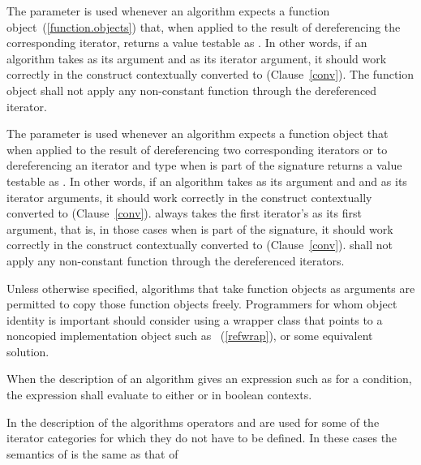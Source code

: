 \pnum
The
parameter is used whenever an algorithm expects a function object~(\ref{function.objects})
that, when applied to the result
of dereferencing the corresponding iterator, returns a value testable as
.
In other words, if an algorithm
takes
as its argument and 
as its iterator argument, it should work correctly in the
construct
 contextually converted to  (Clause~\ref{conv}).
The function object
shall not apply any non-constant
function through the dereferenced iterator.

\pnum
The
parameter is used whenever an algorithm expects a function object that when applied to
the result of dereferencing two corresponding iterators or to dereferencing an
iterator and type
when
is part of the signature returns a value testable as
.
In other words, if an algorithm takes
as its argument and  and  as
its iterator arguments, it should work correctly in
the construct
 contextually converted to  (Clause~\ref{conv}).
always takes the first
iterator's 
as its first argument, that is, in those cases when
is part of the signature, it should work
correctly in the
construct  contextually converted to  (Clause~\ref{conv}).
 shall not
apply any non-constant function through the dereferenced iterators.

\pnum
\begin{note}
Unless otherwise specified, algorithms that take function objects as arguments
are permitted to copy those function objects freely. Programmers for whom object
identity is important should consider using a wrapper class that points to a
noncopied implementation object such as ~(\ref{refwrap}), or some equivalent solution.
\end{note}

\pnum
When the description of an algorithm gives an expression such as
for a condition, the expression shall evaluate to
either  or  in boolean contexts.

\pnum
In the description of the algorithms operators
\tcode{+}
and
\tcode{-}
are used for some of the iterator categories for which
they do not have to be defined.
In these cases the semantics of
is the same as that of

